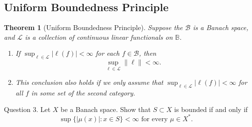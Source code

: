 \documentclass{tufte-handout}
\newtheorem{theorem}{Theorem}[section]
\begin{document}
\subsection{Uniform Boundedness Principle}
\begin{theorem}[Uniform Boundedness Principle]
    Suppose the $\mathcal{B}$ is a Banach space, and $\mathcal{L}$ is a collection of continuous linear functionals on $\mathbb{B}$.
    \mbox{}
    \begin{enumerate}
    \item If $\sup_{\ell \in \mathcal{L}} |\ell(f)|<\infty$ for each $f\in \mathcal{B}$, then 
    \begin{equation*}
        \sup_{\ell \in \mathcal{L}} \| \ell\|<\infty.
    \end{equation*}
    \item This conclusion also holds if we only assume that $ \sup_{\ell \in \mathcal{L}} |\ell(f)|<\infty$ for all $f$ in some set of the second category.
    \end{enumerate}
\end{theorem}


Question 3. Let $X$ be a Banach space. Show that $S \subset X$ is bounded if and only if
\begin{equation*}
\sup \{|\mu(x)|: x \in S\}<\infty \text { for every } \mu \in X^* \text {. }
\end{equation*}




\end{document}
